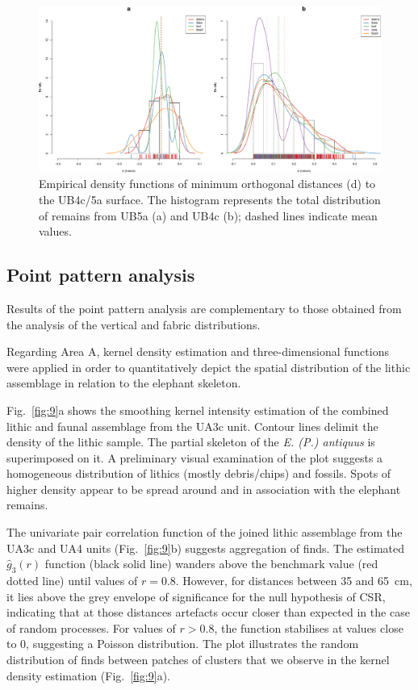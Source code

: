 \documentclass[review,authoryear,times]{elsarticle} %
\begin{document}
\begin{figure}[]
  \centering
  \includegraphics[width=1\textwidth]{../artwork/Fig8.pdf}
  \caption{Empirical density functions of minimum orthogonal distances (d) to the UB4c/5a surface. The histogram represents the total distribution of remains from UB5a (a) and UB4c (b); dashed lines indicate mean values.}
  \label{fig:8}
\end{figure}

\subsection{Point pattern analysis}

Results of the point pattern analysis are complementary to those obtained from the analysis of the vertical and fabric distributions.  


Regarding Area A, kernel density estimation and three-dimensional functions were applied in order to quantitatively depict the spatial distribution of the lithic assemblage in relation to the elephant skeleton.

Fig.~\ref{fig:9}a shows the smoothing kernel intensity estimation of the combined lithic and faunal assemblage from the UA3c unit. Contour lines delimit the density of the lithic sample. The partial skeleton of the \emph{E. (P.) antiquus} is superimposed on it. A preliminary visual examination of the plot suggests a homogeneous distribution of lithics (mostly debris/chips) and fossils. Spots of higher density appear to be spread around and in association with the elephant remains.

The univariate pair correlation function of the joined lithic assemblage from the UA3c and UA4 units (Fig.~\ref{fig:9}b) suggests aggregation of finds. The estimated $\hat{g}_3(r)$ function (black solid line) wanders above the benchmark value (red dotted line) until values of $r=0.8$. However, for distances between 35 and 65~cm, it lies above the grey envelope of significance for the null hypothesis of CSR, indicating that at those distances artefacts occur closer than expected in the case of random processes. For values of $r>0.8$, the function stabilises at values close to 0, suggesting a Poisson distribution. The plot illustrates the random distribution of finds between patches of clusters that we observe in the kernel density estimation (Fig.~\ref{fig:9}a).
\end{document}
